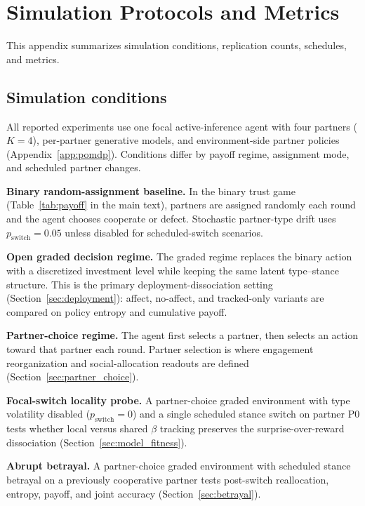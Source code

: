 \section{Simulation Protocols and Metrics}
\label{app:protocols}

This appendix summarizes simulation conditions, replication counts, schedules, and metrics.

\subsection{Simulation conditions}

All reported experiments use one focal active-inference agent with four partners ($K=4$), per-partner generative models, and environment-side partner policies (Appendix~\ref{app:pomdp}). Conditions differ by payoff regime, assignment mode, and scheduled partner changes.

\textbf{Binary random-assignment baseline.} In the binary trust game (Table~\ref{tab:payoff} in the main text), partners are assigned randomly each round and the agent chooses cooperate or defect. Stochastic partner-type drift uses $p_{\mathrm{switch}}=0.05$ unless disabled for scheduled-switch scenarios.

\textbf{Open graded decision regime.} The graded regime replaces the binary action with a discretized investment level while keeping the same latent type--stance structure. This is the primary deployment-dissociation setting (Section~\ref{sec:deployment}): affect, no-affect, and tracked-only variants are compared on policy entropy and cumulative payoff.

\textbf{Partner-choice regime.} The agent first selects a partner, then selects an action toward that partner each round. Partner selection is where engagement reorganization and social-allocation readouts are defined (Section~\ref{sec:partner_choice}).

\textbf{Focal-switch locality probe.} A partner-choice graded environment with type volatility disabled ($p_{\mathrm{switch}}=0$) and a single scheduled stance switch on partner P0 tests whether local versus shared $\beta$ tracking preserves the surprise-over-reward dissociation (Section~\ref{sec:model_fitness}).

\textbf{Abrupt betrayal.} A partner-choice graded environment with scheduled stance betrayal on a previously cooperative partner tests post-switch reallocation, entropy, payoff, and joint accuracy (Section~\ref{sec:betrayal}).

